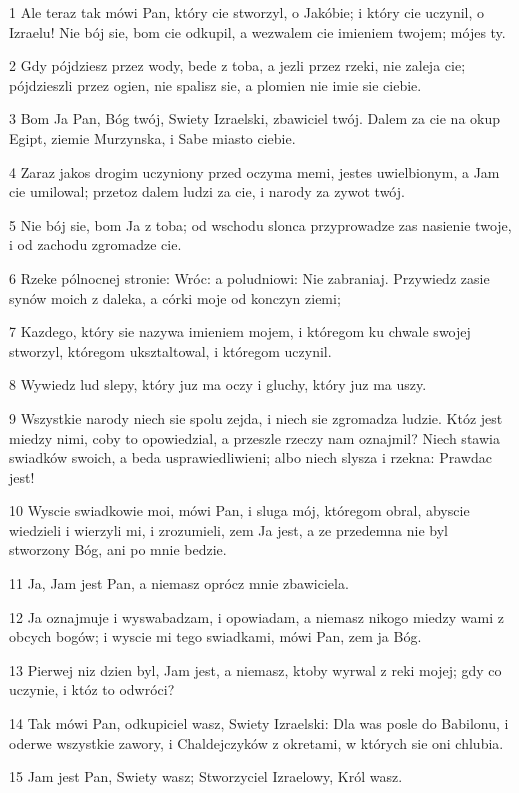 \par 1 Ale teraz tak mówi Pan, który cie stworzyl, o Jakóbie; i który cie uczynil, o Izraelu! Nie bój sie, bom cie odkupil, a wezwalem cie imieniem twojem; mójes ty.
\par 2 Gdy pójdziesz przez wody, bede z toba, a jezli przez rzeki, nie zaleja cie; pójdzieszli przez ogien, nie spalisz sie, a plomien nie imie sie ciebie.
\par 3 Bom Ja Pan, Bóg twój, Swiety Izraelski, zbawiciel twój. Dalem za cie na okup Egipt, ziemie Murzynska, i Sabe miasto ciebie.
\par 4 Zaraz jakos drogim uczyniony przed oczyma memi, jestes uwielbionym, a Jam cie umilowal; przetoz dalem ludzi za cie, i narody za zywot twój.
\par 5 Nie bój sie, bom Ja z toba; od wschodu slonca przyprowadze zas nasienie twoje, i od zachodu zgromadze cie.
\par 6 Rzeke pólnocnej stronie: Wróc: a poludniowi: Nie zabraniaj. Przywiedz zasie synów moich z daleka, a córki moje od konczyn ziemi;
\par 7 Kazdego, który sie nazywa imieniem mojem, i któregom ku chwale swojej stworzyl, któregom uksztaltowal, i któregom uczynil.
\par 8 Wywiedz lud slepy, który juz ma oczy i gluchy, który juz ma uszy.
\par 9 Wszystkie narody niech sie spolu zejda, i niech sie zgromadza ludzie. Któz jest miedzy nimi, coby to opowiedzial, a przeszle rzeczy nam oznajmil? Niech stawia swiadków swoich, a beda usprawiedliwieni; albo niech slysza i rzekna: Prawdac jest!
\par 10 Wyscie swiadkowie moi, mówi Pan, i sluga mój, któregom obral, abyscie wiedzieli i wierzyli mi, i zrozumieli, zem Ja jest, a ze przedemna nie byl stworzony Bóg, ani po mnie bedzie.
\par 11 Ja, Jam jest Pan, a niemasz oprócz mnie zbawiciela.
\par 12 Ja oznajmuje i wyswabadzam, i opowiadam, a niemasz nikogo miedzy wami z obcych bogów; i wyscie mi tego swiadkami, mówi Pan, zem ja Bóg.
\par 13 Pierwej niz dzien byl, Jam jest, a niemasz, ktoby wyrwal z reki mojej; gdy co uczynie, i któz to odwróci?
\par 14 Tak mówi Pan, odkupiciel wasz, Swiety Izraelski: Dla was posle do Babilonu, i oderwe wszystkie zawory, i Chaldejczyków z okretami, w których sie oni chlubia.
\par 15 Jam jest Pan, Swiety wasz; Stworzyciel Izraelowy, Król wasz.
